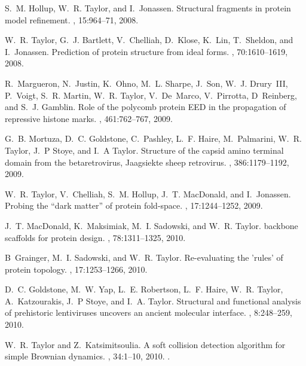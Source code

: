 \begin{thebibliography}{100}
S.~M. Hollup, W.~R. Taylor, and I.~Jonassen.
\newblock Structural fragments in protein model refinement.
, 15:964--71, 2008.

W.~R. Taylor, G.~J. Bartlett, V.~Chelliah, D.~Klose, K.~Lin, T.~Sheldon, and
  I.~Jonassen.
\newblock Prediction of protein structure from ideal forms.
, 70:1610--1619, 2008.

R.~Margueron, N.~Justin, K.~Ohno, M.~L. Sharpe, J.~Son, W.~J. Drury~III,
  P.~Voigt, S.~R. Martin, W.~R. Taylor, V.~De~Marco, V.~Pirrotta, D~Reinberg,
  and S.~J. Gamblin.
\newblock Role of the polycomb protein {EED} in the propagation of repressive
  histone marks.
, 461:762--767, 2009.

G.~B. Mortuza, D.~C. Goldstone, C.~Pashley, L.~F. Haire, M.~Palmarini, W.~R.
  Taylor, J.~P Stoye, and I.~A Taylor.
\newblock Structure of the capsid amino terminal domain from the
  betaretrovirus, {J}aagsiekte sheep retrovirus.
, 386:1179--1192, 2009.

W.~R. Taylor, V.~Chelliah, S.~M. Hollup, J.~T. MacDonald, and I.~Jonassen.
\newblock Probing the ``dark matter'' of protein fold-space.
, 17:1244--1252, 2009.

J.~T. MacDonald, K.~Maksimiak, M.~I. Sadowski, and W.~R. Taylor.
 backbone scaffolds for protein design.
, 78:1311--1325, 2010.

B~Grainger, M.~I. Sadowski, and W.~R. Taylor.
\newblock Re-evaluating the 'rules' of protein topology.
, 17:1253--1266, 2010.

D.~C. Goldstone, M.~W. Yap, L.~E. Robertson, L.~F. Haire, W.~R. Taylor,
  A.~Katzourakis, J.~P Stoye, and I.~A. Taylor.
\newblock Structural and functional analysis of prehistoric lentiviruses
  uncovers an ancient molecular interface.
, 8:248--259, 2010.

W.~R. Taylor and Z.~Katsimitsoulia.
\newblock A soft collision detection algorithm for simple {B}rownian dynamics.
, 34:1--10, 2010.
.


\end{thebibliography}
